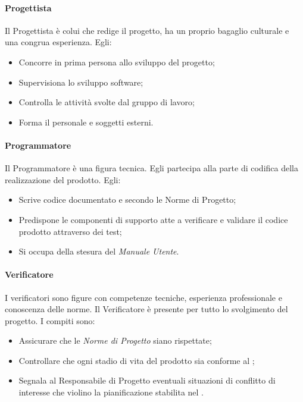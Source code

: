                 \paragraph{Progettista}
                    Il Progettista è colui che redige il progetto, ha un proprio bagaglio culturale e una congrua esperienza. Egli:
                    \begin{itemize}
                        \item Concorre in prima persona allo sviluppo del progetto;
                        \item Supervisiona lo sviluppo software;
                        \item Controlla le attività svolte dal gruppo di lavoro;
                        \item Forma il personale e soggetti esterni.
                    \end{itemize}
                \paragraph{Programmatore}
                    Il Programmatore è una figura tecnica. Egli partecipa alla parte di codifica della realizzazione del prodotto. Egli:
                    \begin{itemize}
                        \item Scrive codice documentato e secondo le Norme di Progetto;
                        \item Predispone le componenti di supporto atte a verificare e validare il codice prodotto attraverso dei test;
                        \item Si occupa della stesura del \textit{Manuale Utente}.
                    \end{itemize}
                \paragraph{Verificatore}
                    I verificatori sono figure con competenze tecniche, esperienza professionale e conoscenza delle norme. Il Verificatore è presente per tutto lo svolgimento del progetto. I compiti sono:
                    \begin{itemize}
                        \item Assicurare che le \textit{Norme di Progetto} siano rispettate;
                        \item Controllare che ogni stadio di vita del prodotto sia conforme al \PdQ;
                        \item Segnala al Responsabile di Progetto eventuali situazioni di conflitto di interesse che violino la pianificazione stabilita nel \PdP.
                    \end{itemize}
